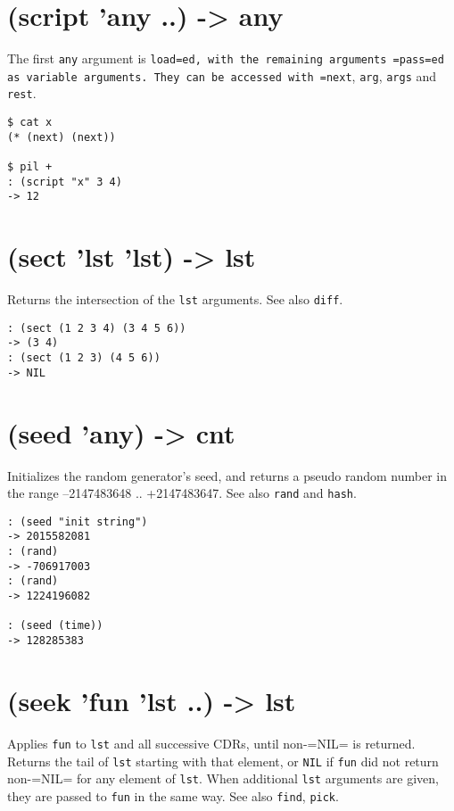 {{{{{{{{ 
\section{(script 'any ..) -> any}
\label{sec-8-1-19-10}


The first \texttt{any} argument is \texttt{load=ed, with the remaining arguments =pass=ed as variable arguments. They can be accessed with =next}, \texttt{arg},
\texttt{args} and \texttt{rest}.


\begin{verbatim}
$ cat x
(* (next) (next))

$ pil +
: (script "x" 3 4)
-> 12
\end{verbatim}

 
\section{(sect 'lst 'lst) -> lst}
\label{sec-8-1-19-11}


Returns the intersection of the \texttt{lst} arguments. See also \texttt{diff}.


\begin{verbatim}
: (sect (1 2 3 4) (3 4 5 6))
-> (3 4)
: (sect (1 2 3) (4 5 6))
-> NIL
\end{verbatim}

 
\section{(seed 'any) -> cnt}
\label{sec-8-1-19-12}


Initializes the random generator's seed, and returns a pseudo random
number in the range --2147483648 .. +2147483647. See also \texttt{rand} and
\texttt{hash}.


\begin{verbatim}
: (seed "init string")
-> 2015582081
: (rand)
-> -706917003
: (rand)
-> 1224196082

: (seed (time))
-> 128285383
\end{verbatim}

 
\section{(seek 'fun 'lst ..) -> lst}
\label{sec-8-1-19-13}


Applies \texttt{fun} to \texttt{lst} and all successive CDRs, until non-=NIL= is
returned. Returns the tail of \texttt{lst} starting with that element, or \texttt{NIL}
if \texttt{fun} did not return non-=NIL= for any element of \texttt{lst}. When
additional \texttt{lst} arguments are given, they are passed to \texttt{fun} in the
same way. See also \texttt{find}, \texttt{pick}.


}}}}}}}}
